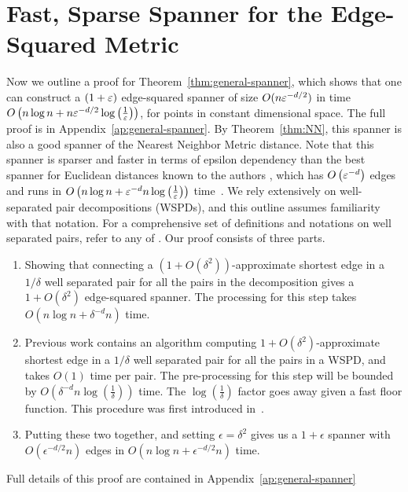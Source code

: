 \section{Fast, Sparse Spanner for the Edge-Squared
Metric}
\label{sec:general-spanner}

Now we outline a proof for Theorem~\ref{thm:general-spanner}, which shows that one can
construct a $(1+\varepsilon)$ edge-squared spanner of size $O(n \varepsilon^{-d/2})$ in
time $O\left(n \log n + n \varepsilon^{-d/2} \log \left(\frac{1}{\varepsilon}\right)\right)$, 
for points in constant dimensional space. The full proof is in
Appendix~\ref{ap:general-spanner}. By Theorem~\ref{thm:NN}, this
spanner is also a good spanner of the Nearest Neighbor Metric distance.
Note that this spanner is sparser and faster in terms of epsilon dependency than the best spanner for
Euclidean distances known to the authors
, which has $O\left(\varepsilon^{-d}\right)$ edges and runs in
$O\left(n \log n +
\varepsilon^{-d}n\log\left(\frac{1}{\varepsilon}\right)\right)$
time~\cite{Callahan1993}. We rely extensively on well-separated pair decompositions
(WSPDs),
and this outline assumes familiarity with that notation.
For a comprehensive set of definitions and notations on well separated
pairs, refer to any of \cite{Callahan1995, Arya2016, Callahan1993,
arya95euclid}.  
Our proof consists of three parts.
\begin{enumerate}
\item Showing that connecting a $(1+O(\delta^2))$-approximate shortest edge
in a $1/\delta$ well separated pair for all the pairs in the decomposition
gives a $1+O(\delta^2)$ edge-squared spanner.
The processing for this step takes $O(n \log n + \delta^{-d}n)$ time.
\item Previous work contains an algorithm computing
  $1+O(\delta^2)$-approximate shortest edge in a $1/\delta$ well
    separated pair for all the pairs in a WSPD, and takes
    $O(1)$ time per pair. The pre-processing for this step will be
    bounded by $O(\delta^{-d}n\log\left(\frac{1}{\delta}\right))$ time. The $\log\left(\frac{1}{\delta}\right)$ factor goes away given a fast floor function. 
    This procedure was first introduced in~\cite{Callahan1995}.

\item Putting these two together, and setting $\epsilon = \delta^2$
gives us a $1+\epsilon$ spanner with
$O(\epsilon^{-d/2}n)$ edges in
    $O(n \log n + \epsilon^{-d/2}n)$ time.
\end{enumerate}
Full details of this proof are contained in Appendix~\ref{ap:general-spanner}

